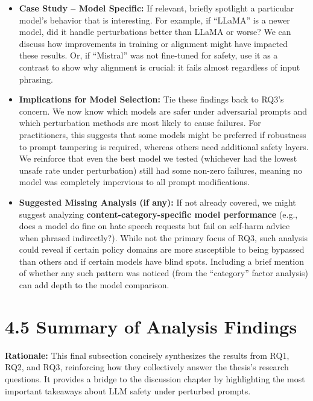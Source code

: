\begin{itemize}
  \item \textbf{Case Study – Model Specific:} If relevant, briefly spotlight a particular model’s behavior that is interesting. For example, if “LLaMA” is a newer model, did it handle perturbations better than LLaMA or worse? We can discuss how improvements in training or alignment might have impacted these results. Or, if “Mistral” was not fine\--tuned for safety, use it as a contrast to show why alignment is crucial: it fails almost regardless of input phrasing.

  \item \textbf{Implications for Model Selection:} Tie these findings back to RQ3’s concern. We now know which models are safer under adversarial prompts and which perturbation methods are most likely to cause failures. For practitioners, this suggests that some models might be preferred if robustness to prompt tampering is required, whereas others need additional safety layers. We reinforce that even the best model we tested (whichever had the lowest unsafe rate under perturbation) still had some non\--zero failures, meaning no model was completely impervious to all prompt modifications.

  \item \textbf{Suggested Missing Analysis (if any):} If not already covered, we might suggest analyzing \textbf{content\--category\--specific model performance} (e.g., does a model do fine on hate speech requests but fail on self\--harm advice when phrased indirectly?). While not the primary focus of RQ3, such analysis could reveal if certain policy domains are more susceptible to being bypassed than others and if certain models have blind spots. Including a brief mention of whether any such pattern was noticed (from the “category” factor analysis) can add depth to the model comparison.
\end{itemize}

\section{4.5 Summary of Analysis Findings}
\textbf{Rationale:} This final subsection concisely synthesizes the results from RQ1, RQ2, and RQ3, reinforcing how they collectively answer the thesis’s research questions. It provides a bridge to the discussion chapter by highlighting the most important takeaways about LLM safety under perturbed prompts.

